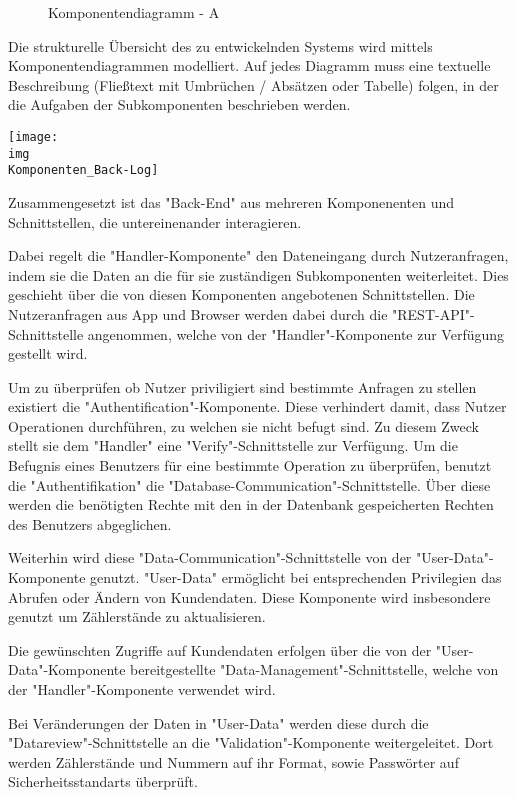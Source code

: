 \begin{figure}[h]
	\centering
	\caption{Komponentendiagramm - A}
	\label{fig:komponentendiagramm-a}
\end{figure}

\begin{tcolorbox}
Die strukturelle Übersicht des zu entwickelnden Systems wird mittels Komponentendiagrammen modelliert. 
Auf jedes Diagramm muss eine textuelle Beschreibung (Fließtext mit Umbrüchen / Absätzen oder Tabelle) folgen, in der die Aufgaben der Subkomponenten beschrieben werden. 
\end{tcolorbox}

\texttt{[image: \\img\\Komponenten\_Back-Log]}

Zusammengesetzt ist das "Back-End" aus mehreren Komponenenten und Schnittstellen, die untereinenander interagieren.

Dabei regelt die "Handler-Komponente" den Dateneingang durch Nutzeranfragen, indem sie die Daten an die für sie zuständigen Subkomponenten weiterleitet. Dies geschieht über die von diesen Komponenten angebotenen Schnittstellen. Die Nutzeranfragen aus App und Browser werden dabei durch die "REST-API"-Schnittstelle angenommen, welche von der "Handler"-Komponente zur Verfügung gestellt wird. 

Um zu überprüfen ob Nutzer priviligiert sind bestimmte Anfragen zu stellen existiert die "Authentification"-Komponente. Diese verhindert damit, dass Nutzer Operationen durchführen, zu welchen sie nicht befugt sind. Zu diesem Zweck stellt sie dem "Handler" eine "Verify"-Schnittstelle zur Verfügung. Um die Befugnis eines Benutzers für eine bestimmte Operation zu überprüfen, benutzt die "Authentifikation" die "Database-Communication"-Schnittstelle. Über diese werden die benötigten Rechte mit den in der Datenbank gespeicherten Rechten des Benutzers abgeglichen.

Weiterhin wird diese "Data-Communication"-Schnittstelle von der "User-Data"-Komponente genutzt. "User-Data" ermöglicht bei entsprechenden Privilegien das Abrufen oder Ändern von Kundendaten. Diese Komponente wird insbesondere genutzt um Zählerstände zu aktualisieren. 

Die gewünschten Zugriffe auf Kundendaten erfolgen über die von der "User-Data"-Komponente bereitgestellte "Data-Management"-Schnittstelle, welche von der "Handler"-Komponente verwendet wird. 

Bei Veränderungen der Daten in "User-Data" werden diese durch die "Datareview"-Schnittstelle an die "Validation"-Komponente weitergeleitet. Dort werden Zählerstände und Nummern auf ihr Format, sowie Passwörter auf Sicherheitsstandarts überprüft.

